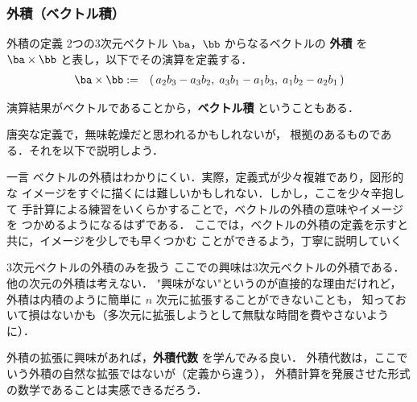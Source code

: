         \subsubsection{外積（ベクトル積）}
            \begin{mysmallsec}{外積の定義}
                2つの3次元ベクトル $\ba$，$\bb$ からなるベクトルの \textbf{外積} を
                $\ba\times\bb$ と表し，以下でその演算を定義する．
                    \begin{align*}
                            \ba \times \bb &:=& (\,
                                    a_{2}b_{3} - a_{3}b_{2},\;
                                    a_{3}b_{1} - a_{1}b_{3},\;
                                    a_{1}b_{2} - a_{2}b_{1}
                                \,)
                    \end{align*}

                演算結果がベクトルであることから，\textbf{ベクトル積} ということもある．

                唐突な定義で，無味乾燥だと思われるかもしれないが，
                根拠のあるものである．それを以下で説明しよう．
            \end{mysmallsec}

            \begin{mysmallsec}{一言}
                ベクトルの外積はわかりにくい．実際，定義式が少々複雑であり，図形的な
                イメージをすぐに描くには難しいかもしれない．しかし，ここを少々辛抱して
                手計算による練習をいくらかすることで，ベクトルの外積の意味やイメージを
                つかめるようになるはずである．
                ここでは，ベクトルの外積の定義を示すと共に，イメージを少しでも早くつかむ
                ことができるよう，丁寧に説明していく
            \end{mysmallsec}

            \begin{mysmallsec}{3次元ベクトルの外積のみを扱う}
                ここでの興味は3次元ベクトルの外積である．他の次元の外積は考えない．
                "興味がない"というのが直接的な理由だけれど，
                外積は内積のように簡単に $n$ 次元に拡張することができないことも，
                知っておいて損はないかも（多次元に拡張しようとして無駄な時間を費やさないように）．

                外積の拡張に興味があれば，\textbf{外積代数} を学んでみる良い．
                外積代数は，ここでいう外積の自然な拡張ではないが（定義から違う），
                外積計算を発展させた形式の数学であることは実感できるだろう．
            \end{mysmallsec}

